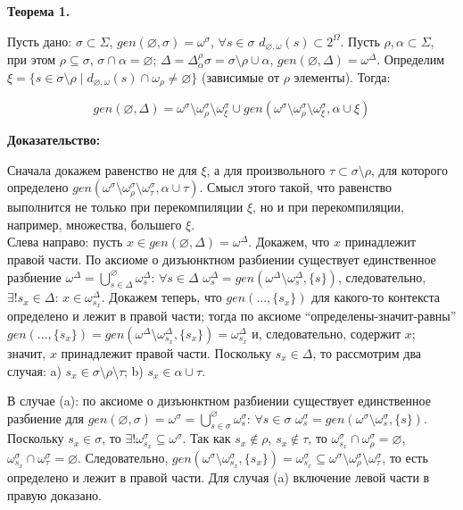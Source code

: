 \hrulefill

\textbf{Теорема 1.} 

Пусть дано: $\sigma \subset \Sigma$, $gen(\varnothing, \sigma) = \omega^\sigma$, $\forall s \in \sigma$ $d_{\varnothing,\omega}(s) \subset 2^\Omega$. Пусть $\rho, \alpha \subset \Sigma$, при этом $\rho \subseteq \sigma$, $\sigma \cap \alpha = \varnothing$; $\Delta = \Delta^\rho_\alpha\sigma = \sigma\setminus\rho\cup\alpha$, $gen(\varnothing, \Delta) = \omega^\Delta$. Определим $\xi = \{s \in \sigma\setminus\rho \mid d_{\varnothing,\omega}(s) \cap \omega_\rho \neq \varnothing\}$ (зависимые от $\rho$ элементы). 
Тогда:

$$gen(\varnothing, \Delta) = \omega^\sigma \setminus \omega^\sigma_\rho \setminus \omega^\sigma_\xi \cup gen(\omega^\sigma \setminus \omega^\sigma_\rho \setminus \omega^\sigma_\xi, \alpha \cup \xi)$$

\textbf{Доказательство:}

Сначала докажем равенство не для $\xi$, а для произвольного $\tau \subset \sigma\setminus\rho$, для которого определено $gen(\omega^\sigma \setminus \omega^\sigma_\rho \setminus \omega^\sigma_\tau, \alpha\cup\tau)$. Смысл этого такой, что равенство выполнится не только при перекомпиляции $\xi$, но и при перекомпиляции, например, множества, большего $\xi$.
\\

Слева направо: пусть $x \in gen(\varnothing, \Delta) = \omega^\Delta$. Докажем, что $x$ принадлежит правой части. По аксиоме о дизъюнктном разбиении существует единственное разбиение $\omega^\Delta = \bigcup^\varnothing_{s\in\Delta}\omega^\Delta_s$: $\forall s \in \Delta$ $\omega^\Delta_s = gen(\omega^\Delta\setminus\omega^\Delta_s, \{s\})$, следовательно, $\exists ! s_x \in \Delta$: $x \in \omega^\Delta_{s_x}$. Докажем теперь, что $gen(..., \{s_x\})$ для какого-то контекста определено и лежит в правой части; тогда по аксиоме ``определены-значит-равны'' $gen(..., \{s_x\}) = gen(\omega^\Delta\setminus\omega^\Delta_{s_x}, \{s_x\}) = \omega^\Delta_{s_x}$ и, следовательно, содержит $x$; значит, $x$ принадлежит правой части. Поскольку $s_x \in \Delta$, то рассмотрим два случая: a) $s_x \in \sigma\setminus\rho\setminus\tau$; b) $s_x \in \alpha\cup\tau$.

В случае (a): по аксиоме о дизъюнктном разбиении существует единственное разбиение для $gen(\varnothing, \sigma) = \omega^\sigma = \bigcup^\varnothing_{s\in\sigma}\omega^\sigma_s$: $\forall s \in \sigma$ $\omega^\sigma_s = gen(\omega^\sigma\setminus\omega^\sigma_s, \{s\})$. Поскольку $s_x \in \sigma$, то $\exists ! \omega^\sigma_{s_x} \subseteq \omega^\sigma$. Так как $s_x \notin \rho$, $s_x \notin \tau$, то $\omega^\sigma_{s_x} \cap \omega^\sigma_\rho = \varnothing$, $\omega^\sigma_{s_x} \cap \omega^\sigma_\tau = \varnothing$. Следовательно, $gen(\omega^\sigma\setminus\omega^\sigma_{s_x}, \{s_x\}) = \omega^\sigma_{s_x} \subseteq \omega^\sigma \setminus \omega^\sigma_\rho \setminus \omega^\sigma_\tau$, то есть определено и лежит в правой части. Для случая (a) включение левой части в правую доказано.

